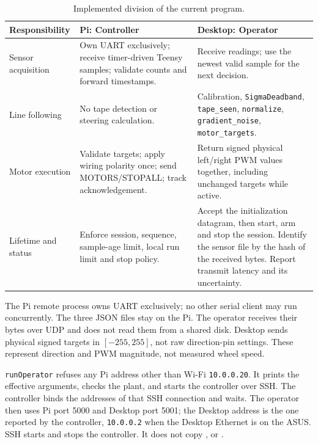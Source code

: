 \begin{table}[H]
\centering\small
\caption{Implemented division of the current program.}
\label{tab:remote-split}
\begin{tabular}{@{}L{3.0cm}L{6.2cm}L{7.0cm}@{}}
\toprule
Responsibility & Pi: Controller & Desktop: Operator \\
\midrule
Sensor acquisition & Own UART exclusively; receive timer-driven Teensy samples; validate counts and forward timestamps. & Receive readings; use the newest valid sample for the next decision. \\
Line following & No tape detection or steering calculation. & Calibration, \texttt{SigmaDeadband}, \texttt{tape\_seen}, \texttt{normalize}, \texttt{gradient\_noise}, \texttt{motor\_targets}. \\
Motor execution & Validate targets; apply wiring polarity once; send MOTORS/STOPALL; track acknowledgement. & Return signed physical left/right PWM values together, including unchanged targets while active. \\
Lifetime and status & Enforce session, sequence, sample-age limit, local run limit and stop policy. & Accept the initialization datagram, then start, arm and stop the session. Identify the sensor file by the hash of the received bytes. Report transmit latency and its uncertainty. \\
\bottomrule
\end{tabular}
\end{table}

The Pi remote process owns UART exclusively; no other serial client may run concurrently. The three JSON files stay on the Pi. The operator receives their bytes over UDP and does not read them from a shared disk. Desktop sends physical signed targets in $[-255,255]$, not raw direction-pin settings. These represent direction and PWM magnitude, not measured wheel speed.

\texttt{runOperator} refuses any Pi address other than Wi-Fi \texttt{10.0.0.20}. It prints the effective arguments, checks the plant, and starts the controller over SSH. The controller binds the addresses of that SSH connection and waits. The operator then uses Pi port 5000 and Desktop port 5001; the Desktop address is the one reported by the controller, \texttt{10.0.0.2} when the Desktop Ethernet is on the ASUS. SSH starts and stops the controller. It does not copy ,  or .

